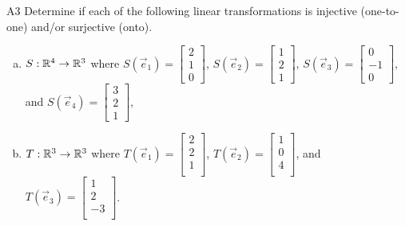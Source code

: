 \begin{problem}{A3}
Determine if each of the following linear transformations is injective (one-to-one) and/or surjective (onto).
\begin{enumerate}[(a)]
\item
  \(S: \mathbb{R}^4 \rightarrow \mathbb{R}^3\) where
  \(S(\vec e_1)=\begin{bmatrix}
    2  \\
    1 \\
    0
  \end{bmatrix}\),
  \(S(\vec e_2)=\begin{bmatrix}
    1  \\
    2\\
    1
  \end{bmatrix}\),
  \(S(\vec e_3)=\begin{bmatrix}
    0  \\
    -1 \\
    0
  \end{bmatrix}\), and
  \(S(\vec e_4)=\begin{bmatrix}
    3 \\
    2\\
    1
  \end{bmatrix}\),
\item
  \(T: \mathbb{R}^3 \rightarrow \mathbb{R}^3\) where
  \(T(\vec e_1)=\begin{bmatrix}
    2  \\
    2 \\
    1\\
  \end{bmatrix}\),
  \(T(\vec e_2)=\begin{bmatrix}
     1 \\
     0 \\
     4 \\
  \end{bmatrix}\), and
  \(T(\vec e_3)=\begin{bmatrix}
     1 \\
     2 \\
     -3 \\
  \end{bmatrix}\).
\end{enumerate}
\end{problem}
